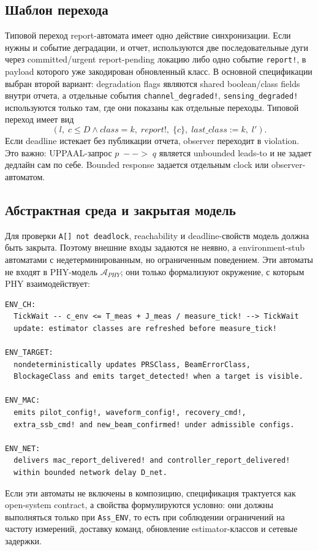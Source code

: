 \documentclass[10pt,a4paper]{article}
\newcommand{\code}[1]{\texttt{#1}}
\newcommand{\A}[1]{\mathcal{A}_{#1}}
\begin{document}
\subsection{Шаблон перехода}

Типовой переход report-автомата имеет одно действие синхронизации. Если нужны и событие деградации, и отчет, используются две последовательные дуги через committed/urgent report-pending локацию либо одно событие \code{report!}, в payload которого уже закодирован обновленный класс. В основной спецификации выбран второй вариант: degradation flags являются shared boolean/class fields внутри отчета, а отдельные события \code{channel\_degraded!}, \code{sensing\_degraded!} используются только там, где они показаны как отдельные переходы. Типовой переход имеет вид
\begin{equation}
(l,\;c\le D\wedge class=k,\;report!,\;\{c\},\;last\_class:=k,\;l').
\end{equation}
Если deadline истекает без публикации отчета, observer переходит в violation. Это важно: UPPAAL-запрос \(p\;--\!>\;q\) является unbounded leads-to и не задает дедлайн сам по себе. Bounded response задается отдельным clock или observer-автоматом.

\subsection{Абстрактная среда и закрытая модель}

Для проверки \code{A[] not deadlock}, reachability и deadline-свойств модель должна быть закрыта. Поэтому внешние входы задаются не неявно, а environment-stub автоматами с недетерминированным, но ограниченным поведением. Эти автоматы не входят в PHY-модель \(\A{PHY}\); они только формализуют окружение, с которым PHY взаимодействует:
\begin{verbatim}
ENV_CH:
  TickWait -- c_env <= T_meas + J_meas / measure_tick! --> TickWait
  update: estimator classes are refreshed before measure_tick!

ENV_TARGET:
  nondeterministically updates PRSClass, BeamErrorClass,
  BlockageClass and emits target_detected! when a target is visible.

ENV_MAC:
  emits pilot_config!, waveform_config!, recovery_cmd!,
  extra_ssb_cmd! and new_beam_confirmed! under admissible configs.

ENV_NET:
  delivers mac_report_delivered! and controller_report_delivered!
  within bounded network delay D_net.
\end{verbatim}
Если эти автоматы не включены в композицию, спецификация трактуется как open-system contract, а свойства формулируются условно: они должны выполняться только при \code{Ass\_ENV}, то есть при соблюдении ограничений на частоту измерений, доставку команд, обновление estimator-классов и сетевые задержки.
\end{document}
